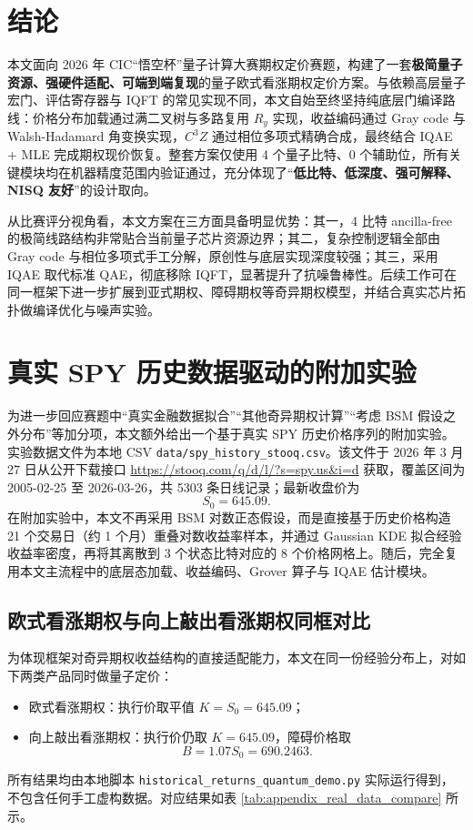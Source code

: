 \documentclass[12pt,a4paper]{ctexart}
\begin{document}
\section{结论}
本文面向 2026 年 CIC“悟空杯”量子计算大赛期权定价赛题，构建了一套\textbf{极简量子资源、强硬件适配、可端到端复现}的量子欧式看涨期权定价方案。与依赖高层量子宏门、评估寄存器与 IQFT 的常见实现不同，本文自始至终坚持纯底层门编译路线：价格分布加载通过满二叉树与多路复用 $R_y$ 实现，收益编码通过 Gray code 与 Walsh-Hadamard 角变换实现，$C^3Z$ 通过相位多项式精确合成，最终结合 IQAE + MLE 完成期权现价恢复。整套方案仅使用 4 个量子比特、0 个辅助位，所有关键模块均在机器精度范围内验证通过，充分体现了“\textbf{低比特、低深度、强可解释、NISQ 友好}”的设计取向。

从比赛评分视角看，本文方案在三方面具备明显优势：其一，4 比特 ancilla-free 的极简线路结构非常贴合当前量子芯片资源边界；其二，复杂控制逻辑全部由 Gray code 与相位多项式手工分解，原创性与底层实现深度较强；其三，采用 IQAE 取代标准 QAE，彻底移除 IQFT，显著提升了抗噪鲁棒性。后续工作可在同一框架下进一步扩展到亚式期权、障碍期权等奇异期权模型，并结合真实芯片拓扑做编译优化与噪声实验。

\appendix
\section{真实 SPY 历史数据驱动的附加实验}
为进一步回应赛题中“真实金融数据拟合”“其他奇异期权计算”“考虑 BSM 假设之外分布”等加分项，本文额外给出一个基于真实 SPY 历史价格序列的附加实验。实验数据文件为本地 CSV \texttt{data/spy\_history\_stooq.csv}。该文件于 2026 年 3 月 27 日从公开下载接口 \url{https://stooq.com/q/d/l/?s=spy.us&i=d} 获取，覆盖区间为 2005-02-25 至 2026-03-26，共 5303 条日线记录；最新收盘价为
\begin{equation}
S_0 = 645.09.
\end{equation}
在附加实验中，本文不再采用 BSM 对数正态假设，而是直接基于历史价格构造 21 个交易日（约 1 个月）重叠对数收益率样本，并通过 Gaussian KDE 拟合经验收益率密度，再将其离散到 3 个状态比特对应的 8 个价格网格上。随后，完全复用本文主流程中的底层态加载、收益编码、Grover 算子与 IQAE 估计模块。

\subsection{欧式看涨期权与向上敲出看涨期权同框对比}
为体现框架对奇异期权收益结构的直接适配能力，本文在同一份经验分布上，对如下两类产品同时做量子定价：
\begin{itemize}[leftmargin=2em]
\item 欧式看涨期权：执行价取平值 $K=S_0=645.09$；
\item 向上敲出看涨期权：执行价仍取 $K=645.09$，障碍价格取
\begin{equation}
B=1.07 S_0=690.2463.
\end{equation}
\end{itemize}
所有结果均由本地脚本 \texttt{historical\_returns\_quantum\_demo.py} 实际运行得到，不包含任何手工虚构数据。对应结果如表 \ref{tab:appendix_real_data_compare} 所示。
\end{document}
